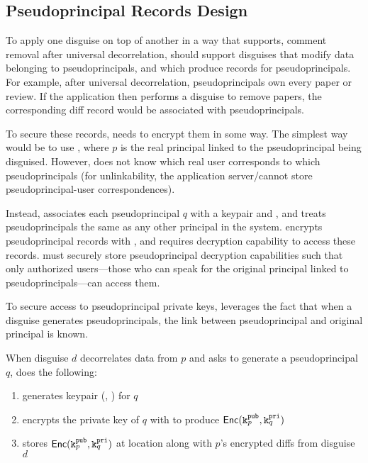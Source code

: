 \subsection{Pseudoprincipal Records Design}

To apply one disguise on top of another in a way that supports, \eg comment removal after universal
decorrelation, \sys should support disguises that modify data belonging to pseudoprincipals, and which
produce records for pseudoprincipals.
%
For example, after universal decorrelation, pseudoprincipals own every paper or review. If the
application then performs a disguise to remove papers, the corresponding diff record would be
associated with pseudoprincipals.

To secure these records, \sys needs to encrypt them in some way. The simplest way would be to use
, where $p$ is the real principal linked to the pseudoprincipal being disguised.
However, \sys does not know which real user corresponds to which pseudoprincipals (for
unlinkability, the application server/\sys cannot store pseudoprincipal-user correspondences). 

Instead, \sys associates each pseudoprincipal $q$ with a keypair  and , and treats
pseudoprincipals the same as any other principal in the system. \sys encrypts pseudoprincipal records
with , and requires decryption capability  to access these records. \sys must
securely store pseudoprincipal decryption capabilities  such that only authorized
users---those who can speak for the original principal linked to pseudoprincipals---can
access them.

To secure access to pseudoprincipal private keys, \sys leverages the fact that 
when a disguise generates pseudoprincipals, the link between pseudoprincipal and original principal
is known. 

When disguise $d$ decorrelates data from $p$ and asks \sys to generate a pseudoprincipal $q$, \sys does the following: 
\begin{enumerate}
    \item \sys generates keypair (, ) for $q$
    \item encrypts the private key of $q$ with  to produce $\mathsf{Enc}(\texttt{\ensuremath{\texttt{k}^{\text{pub}}_{p}}}, \texttt{\ensuremath{\texttt{k}^{\text{pri}}_{q}}})$
    \item stores $\mathsf{Enc}(\texttt{\ensuremath{\texttt{k}^{\text{pub}}_{p}}}, \texttt{\ensuremath{\texttt{k}^{\text{pri}}_{q}}})$ at location  along with $p$'s encrypted diffs from disguise $d$
\end{enumerate}


